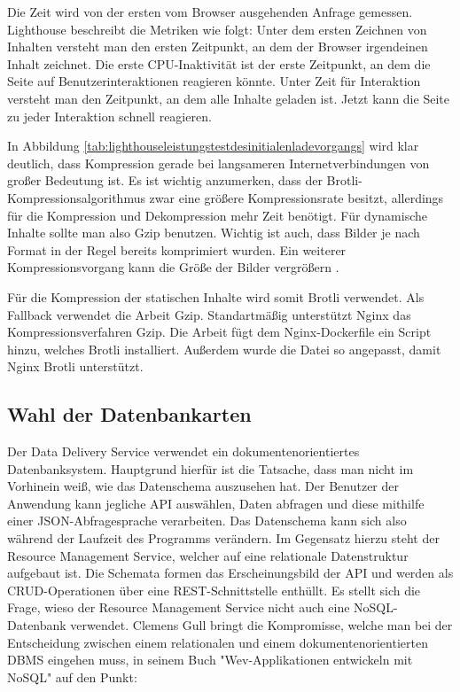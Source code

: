 Die Zeit wird von der ersten vom Browser ausgehenden Anfrage gemessen.
Lighthouse beschreibt die Metriken wie folgt: Unter dem ersten Zeichnen
von Inhalten versteht man den ersten Zeitpunkt, an dem der Browser
irgendeinen Inhalt zeichnet. Die erste CPU-Inaktivität ist
der erste Zeitpunkt, an dem die Seite auf Benutzerinteraktionen reagieren könnte.
Unter Zeit für Interaktion versteht man den Zeitpunkt, an dem alle Inhalte geladen ist.
Jetzt kann die Seite zu jeder Interaktion schnell reagieren.\cite{WhatPerformanceMetricsMeasure}

In Abbildung \ref{tab:lighthouseleistungstestdesinitialenladevorgangs} wird klar deutlich,
dass Kompression gerade bei langsameren Internetverbindungen von großer Bedeutung ist.
Es ist wichtig anzumerken, dass der Brotli-Kompressionsalgorithmus zwar eine größere
Kompressionsrate besitzt, allerdings für die Kompression und Dekompression mehr Zeit
benötigt.\cite{CompressionBenchmark} Für dynamische Inhalte sollte man also Gzip
benutzen. Wichtig ist auch, dass Bilder je nach Format in der Regel bereits komprimiert wurden.
Ein weiterer Kompressionsvorgang kann die Größe der Bilder vergrößern \cite{CloudFlareCompressionDiscussion}.

Für die Kompression der statischen Inhalte wird somit Brotli verwendet.
Als Fallback verwendet die Arbeit Gzip. Standartmäßig unterstützt Nginx
das Kompressionsverfahren Gzip. Die Arbeit fügt dem Nginx-Dockerfile ein Script
hinzu, welches Brotli installiert. Außerdem wurde die  Datei
so angepasst, damit Nginx Brotli unterstützt.

\subsection{Wahl der Datenbankarten}
\label{subsec:wahlderdatenbankarten}
Der Data Delivery Service verwendet ein dokumentenorientiertes Datenbanksystem.
Hauptgrund hierfür ist die Tatsache, dass man nicht im Vorhinein weiß, wie das
Datenschema auszusehen hat. Der Benutzer der Anwendung kann jegliche API
auswählen, Daten abfragen und diese mithilfe einer JSON-Abfragesprache verarbeiten. Das Datenschema
kann sich also während der Laufzeit des Programms verändern. Im Gegensatz hierzu steht der Resource
Management Service, welcher auf eine relationale Datenstruktur aufgebaut ist. Die Schemata formen das
Erscheinungsbild der API und werden als CRUD-Operationen über eine REST-Schnittstelle enthüllt.
Es stellt sich die Frage, wieso der Resource Management Service nicht auch eine NoSQL-Datenbank verwendet.
Clemens Gull bringt die Kompromisse, welche man bei der Entscheidung zwischen einem relationalen
und einem dokumentenorientierten DBMS eingehen muss, in seinem Buch "Wev-Applikationen
entwickeln mit NoSQL" auf den Punkt:

